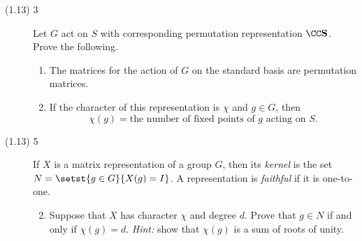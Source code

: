 \documentclass{math174}
\date{Monday, February 25}
\author{}
\begin{document}
\begin{description}
\item[(1.13) 3] Let \(G\) act on \(S\) with corresponding permutation
  representation \(\CC \mathbf S\).  Prove the following.

  \begin{enumerate}
  \item The matrices for the action of \(G\) on the standard basis are
    permutation matrices.

    \begin{solution}

    \end{solution}

  \item If the character of this representation is \(\chi\) and
    \(g \in G\), then
    \[
      \chi(g) = \text{the number of fixed points of \(g\) acting on
        \(S\)}.
    \]

    \begin{solution}

    \end{solution}
  \end{enumerate}

\item[(1.13) 5] If \(X\) is a matrix representation of a group \(G\),
  then its \emph{kernel} is the set \(N = \setst{g \in G}{X(g) = I}\).
  A representation is \emph{faithful} if it is one-to-one.
  \begin{enumerate} \setcounter{enumi}{1}
  \item Suppose that \(X\) has character \(\chi\) and degree \(d\).
    Prove that \(g \in N\) if and only if \(\chi(g) = d\).
    \emph{Hint:} show that \(\chi(g)\) is a sum of roots of unity.

    \begin{solution}

    \end{solution}
  \end{enumerate}
\end{description}
\end{document}
